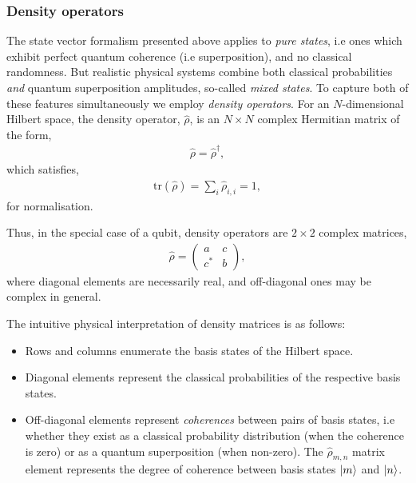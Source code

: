 %
%

\subsubsection{Density operators}

The state vector formalism presented above applies to \textit{pure states}, i.e ones which exhibit perfect quantum coherence (i.e superposition), and no classical randomness. But realistic physical systems combine both classical probabilities \textit{and} quantum superposition amplitudes, so-called \textit{mixed states}. To capture both of these features simultaneously we employ \textit{density operators}. For an $N$-dimensional Hilbert space, the density operator, $\hat\rho$, is an \mbox{$N\times N$} complex Hermitian matrix of the form,
\begin{align}
	\hat\rho = \hat\rho^\dag,
\end{align}
which satisfies,
\begin{align}
\mathrm{tr}(\hat\rho)=\sum_i \hat\rho_{i,i} = 1,	
\end{align}
for normalisation.

Thus, in the special case of a qubit, density operators are \mbox{$2\times 2$} complex matrices,
\begin{align}\label{eq:2x2density}
\hat\rho = \left(\begin{matrix}{}
  a & c \\
  c^* & b
\end{matrix}\right),
\end{align}
where diagonal elements are necessarily real, and off-diagonal ones may be complex in general.

The intuitive physical interpretation of density matrices is as follows:
\begin{itemize}
\item Rows and columns enumerate the basis states of the Hilbert space.
\item Diagonal elements represent the classical probabilities of the respective basis states.
\item Off-diagonal elements represent \textit{coherences} between pairs of basis states, i.e whether they exist as a classical probability distribution (when the coherence is zero) or as a quantum superposition (when non-zero). The $\hat\rho_{m,n}$ matrix element represents the degree of coherence between basis states $|m\rangle$ and $|n\rangle$.
\end{itemize}

